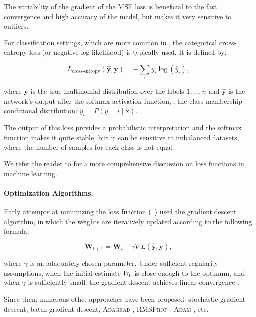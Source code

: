 The variability of the gradient of the \textsc{MSE} loss is beneficial to the fast convergence and high accuracy of the model, but makes it very sensitive to outliers. 

For classification settings, which are more common in \nlp, the categorical cross-entropy loss (or negative log-likelihood) is typically used. It is defined by:

\[ L_\textrm{cross-entropy}(\hat{\mathbf{y}}, \mathbf{y}) = - \sum_i y_i \log (\hat{y}_i) , \]

where $\mathbf{y}$ is the true multinomial distribution over the labels $1, \dots, n$ and $\hat{\mathbf{y}}$ is the network's output after the softmax activation function, \ie, the class membership conditional distribution: $\hat{y}_i = P(y = i \mid \mathbf{x})$.

The output of this loss provides a probabilistic interpretation and the softmax function makes it quite stable, but it can be sensitive to imbalanced datasets, where the number of samples for each class is not equal.

We refer the reader to \citet{wang2020comprehensive} for a more comprehensive discussion on loss functions in machine learning.

\paragraph{Optimization Algorithms.}
Early attempts at minimizing the loss function (\eg\ \citep{rumelhart1985learning}) used the gradient descent algorithm, in which the weights are iteratively updated according to the following formula:

 \[ \mathbf{W}_{t+1} = \mathbf{W}_t - \gamma \nabla L(\hat{\mathbf{y}}, \mathbf{y}) , \]

 where $\gamma$ is an adaquately chosen parameter. Under sufficient regularity assumptions, when the initial estimate $W_0$ is close enough to the optimum, and when $\gamma$ is sufficiently small, the gradient descent achieves linear convergence \citep{dennis1996numerical}.

 Since then, numerous other approaches have been proposed: stochastic gradient descent, batch gradient descent, \textsc{Adagrad} \citep{duchi2011adagrad}, \textsc{RMSProp} \citep{tieleman2012rmsprop}, \textsc{Adam} \citep{kingma2015adam}, etc.

